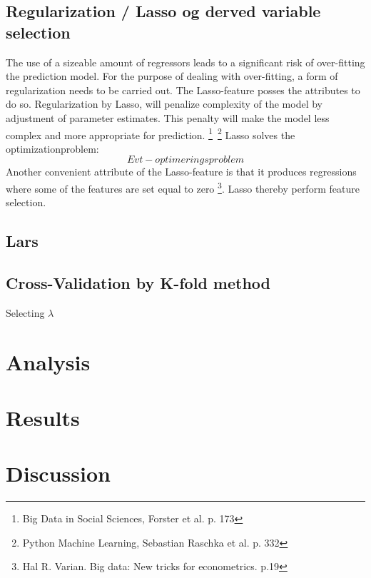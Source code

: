 \documentclass[12pt,a4paper]{article}
\begin{document}
\subsection{Regularization / Lasso og derved variable selection}
The use of a sizeable amount of regressors leads to a significant risk of over-fitting the prediction model. 
For the purpose of dealing with over-fitting, a form of regularization needs to be carried out. The Lasso-feature posses the attributes to do so. Regularization by Lasso, will penalize complexity of the model by adjustment of parameter estimates. This penalty will make the model less complex and more appropriate for prediction. \footnote{Big Data in Social Sciences, Forster et al. p. 173}\, \footnote{Python Machine Learning, Sebastian Raschka et al. p. 332}
\newline Lasso solves the optimizationproblem: $$Evt-optimeringsproblem$$
Another convenient attribute of the Lasso-feature is that it produces regressions where some of the features are set equal to zero \footnote{Hal R. Varian. Big data: New tricks for econometrics. p.19}. Lasso thereby perform feature selection.   

\subsection{Lars}

\subsection{Cross-Validation by K-fold method}
Selecting $\lambda$ 



\section{Analysis}

\section{Results}

\section{Discussion}
\end{document}
